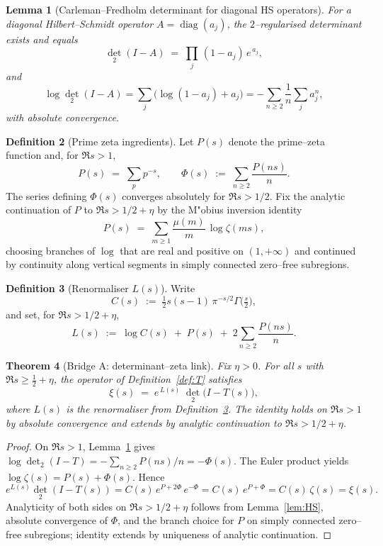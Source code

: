 \documentclass[11pt]{article}
\newtheorem{theorem}{Theorem}
\newtheorem{lemma}[theorem]{Lemma}
\theoremstyle{definition}
\newtheorem{definition}[theorem]{Definition}
\theoremstyle{remark}
\begin{document}
\begin{lemma}[Carleman--Fredholm determinant for diagonal HS operators]\label{lem:det2diag}
For a diagonal Hilbert--Schmidt operator $A=\operatorname{diag}(a_{j})$, the $2$--regularised determinant exists and equals
\[
  \det_{2}(I-A)\;=\;\prod_{j}\,(1-a_{j})\,e^{\,a_{j}},
\]
and
\[
  \log \det_{2}(I-A)
  = \sum_{j}\bigl(\log(1-a_{j})+a_{j}\bigr)
  = -\sum_{n\ge2}\frac{1}{n}\sum_{j} a_{j}^{n},
\]
with absolute convergence.\cite{SimonTraceIdeals}
\end{lemma}

\begin{definition}[Prime zeta ingredients]\label{def:P}
Let $P(s)$ denote the prime--zeta function and, for $\Re s>1$,
\[
  P(s) \;=\; \sum_{p} p^{-s},\qquad
  \Phi(s)\;:=\;\sum_{n\ge2}\frac{P(ns)}{n}.
\]
The series defining $\Phi(s)$ converges absolutely for $\Re s>1/2$. Fix the analytic continuation of $P$ to $\Re s>1/2+\eta$ by the M"obius inversion identity
\[
  P(s)\;=\;\sum_{m\ge1}\frac{\mu(m)}{m}\,\log\zeta(ms),
\]
choosing branches of $\log$ that are real and positive on $(1,+\infty)$ and continued by continuity along vertical segments in simply connected zero--free subregions.
\end{definition}

\begin{definition}[Renormaliser $L(s)$]\label{def:L-bridgeA}
Write
\[
  C(s)\;:=\;\tfrac12 s(s-1)\,\pi^{-s/2}\Gamma\!\bigl(\tfrac{s}{2}\bigr),
\]
and set, for $\Re s>1/2+\eta$,
\[
  L(s)\;:=\;\log C(s)\;+
           \;P(s)\;+
           \;2\sum_{n\ge2}\frac{P(ns)}{n}.
\]
\end{definition}
\begin{theorem}[Bridge A: determinant--zeta link]\label{thm:BridgeA}
Fix $\eta>0$. For all $s$ with $\Re s\ge\tfrac12+\eta$, the operator of Definition~\ref{def:T} satisfies
\begin{equation}\label{eq:BridgeA}
  \xi(s)\;=\;e^{\,L(s)}\;\det_{2}\!\bigl(I-T(s)\bigr),
\end{equation}
where $L(s)$ is the renormaliser from Definition~\ref{def:L-bridgeA}. The identity holds on $\Re s>1$ by absolute convergence and extends by analytic continuation to $\Re s>1/2+\eta$.
\end{theorem}
\begin{proof}
On $\Re s>1$, Lemma~\ref{lem:det2diag} gives $\log\det_{2}(I-T)=-\sum_{n\ge2}P(ns)/n=-\Phi(s)$. The Euler product yields $\log\zeta(s)=P(s)+\Phi(s)$. Hence
\[
  e^{L(s)}\det_{2}(I-T(s))= C(s)\,e^{P+2\Phi}\,e^{-\Phi}=C(s)\,e^{P+\Phi}=C(s)\,\zeta(s)=\xi(s).
\]
Analyticity of both sides on $\Re s>1/2+\eta$ follows from Lemma~\ref{lem:HS}, absolute convergence of $\Phi$, and the branch choice for $P$ on simply connected zero--free subregions; identity extends by uniqueness of analytic continuation.
\end{proof}
\end{document}
